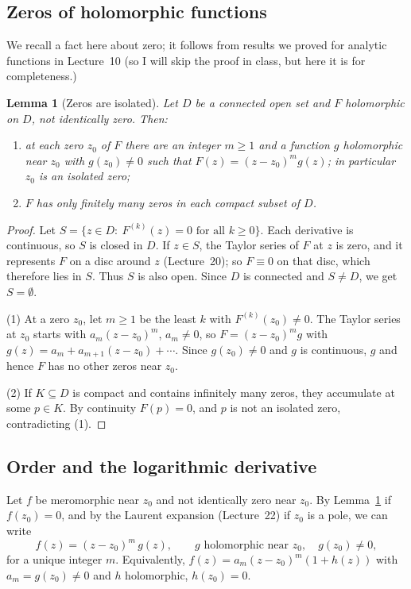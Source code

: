 \documentclass[11pt]{article}
\theoremstyle{plain}
\newtheorem{lemma}[theorem]{Lemma}
\theoremstyle{definition}
\theoremstyle{remark}
\numberwithin{equation}{section}
\begin{document}
\subsection{Zeros of holomorphic functions}
We recall a fact here about zero; it follows from results we proved for analytic functions in Lecture~10 (so I will skip the proof in class, but here it is for completeness.)

\begin{lemma}[Zeros are isolated]\label{lem:zeros}
Let $D$ be a connected open set and $F$ holomorphic on $D$, not
identically zero. Then:
\begin{enumerate}
 \item at each zero $z_0$ of $F$ there are an integer $m\geq1$ and a
 function $g$ holomorphic near $z_0$ with $g(z_0)\ne0$ such that
 $F(z)=(z-z_0)^mg(z)$; in particular $z_0$ is an isolated zero;
 \item $F$ has only finitely many zeros in each compact subset of $D$.
\end{enumerate}
\end{lemma}
\begin{proof}
Let $S=\{z\in D:\ F^{(k)}(z)=0\text{ for all }k\geq0\}$. Each derivative
is continuous, so $S$ is closed in $D$. If $z\in S$, the Taylor series of
$F$ at $z$ is zero, and it represents $F$ on a disc around $z$
(Lecture~20); so $F\equiv0$ on that disc, which therefore lies in $S$.
Thus $S$ is also open. Since $D$ is connected and $S\ne D$, we get
$S=\emptyset$.

(1) At a zero $z_0$, let $m\geq1$ be the least $k$ with
$F^{(k)}(z_0)\ne0$. The Taylor series at $z_0$ starts with
$a_m(z-z_0)^m$, $a_m\ne0$, so $F=(z-z_0)^mg$ with
$g(z)=a_m+a_{m+1}(z-z_0)+\cdots$. Since $g(z_0)\ne0$ and $g$ is
continuous, $g$ and hence $F$ has no other zeros near $z_0$.

(2) If $K\subseteq D$ is compact and contains infinitely many zeros, they
accumulate at some $p\in K$. By continuity $F(p)=0$, and $p$ is not an
isolated zero, contradicting (1).
\end{proof}

\subsection{Order and the logarithmic derivative}
Let $f$ be meromorphic near $z_0$ and not identically zero near $z_0$. By
Lemma~\ref{lem:zeros} if $f(z_0)=0$, and by the Laurent expansion
(Lecture~22) if $z_0$ is a pole, we can write
\[
 f(z)=(z-z_0)^m\,g(z),\qquad g\text{ holomorphic near }z_0,\quad g(z_0)\ne0,
\]
for a unique integer $m$. Equivalently, $f(z)=a_m(z-z_0)^m(1+h(z))$ with
$a_m=g(z_0)\ne0$ and $h$ holomorphic, $h(z_0)=0$.
\end{document}
